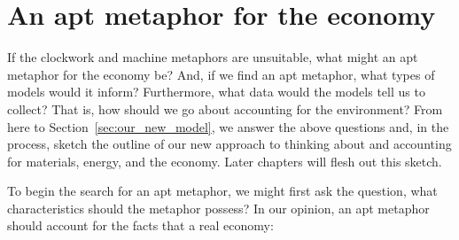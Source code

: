 \section{An apt metaphor for the economy}
\label{sec:apt_metaphor}

If the clockwork and machine metaphors are unsuitable, 
what might an apt metaphor for the economy be?
And, if we find an apt metaphor, what types of models would it inform?
Furthermore, what data would the models tell us to collect?
That is, how should we go about accounting for the environment?
From here to Section~\ref{sec:our_new_model}, we answer the above questions
and, in the process, sketch the outline of our new approach 
to thinking about and accounting for materials, energy, and the economy.
Later chapters will flesh out this sketch.

To begin the search for an apt metaphor, 
we might first ask the question, 
what characteristics should the metaphor possess?
In our opinion, an apt metaphor should account for the facts 
that a real economy:

